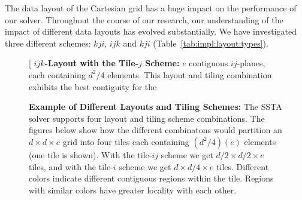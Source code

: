 \documentclass[10pt, conference, compsocconf]{IEEEtran}
\begin{document}
The data layout of the Cartesian grid has a huge impact on the performance
  of our solver.
Throughout the course of our research, our understanding of the impact of
  different data layouts has evolved substantially.
We have investigated three different schemes: \(kji\), \(ijk\) and \(kji\)
  (Table~\ref{tab:impl:layout:types}).

\begin{figure}[!bth]
  \centering
  \caption{\small
    \textbf{Example of Different Layouts and Tiling Schemes:}
      The SSTA solver supports four layout and tiling scheme combinations.
      The figures below show how the different combinatons would partition an
        \(d \times d \times e\) grid into four tiles each containing
        \((d^2/4)(e)\) elements (one tile is shown).
      With the tile-\(ij\) scheme we get \(d/2 \times d/2 \times e\) tiles,
        and with the tile-\(i\) scheme we get \(d \times d/4 \times e\) tiles.
      Different colors indicate different contiguous regions within the tile.
      Regions with similar colors have greater locality with each other. 
  }
  \label{fig:impl:tiling_schemes}
  \begin{minipage}{0.49\textwidth}
    \centering
  \end{minipage}
  \begin{minipage}{0.49\textwidth}
    \centering
    \subfloat[
      \textbf{\(ijk\)-Layout with the Tile-\(j\) Scheme:}
      \(e\) contiguous \(ij\)-planes, each containing \(d^2/4\) elements.
      This layout and tiling combination exhibits the best contiguity for the 

\end{minipage}
\end{figure}
\end{document}
